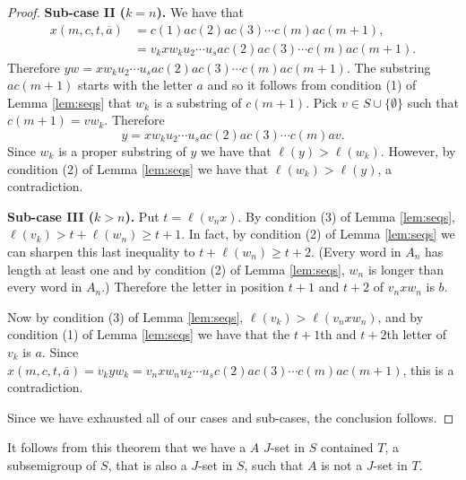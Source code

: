 \begin{proof}
  \textbf{Sub-case II ($k = n$).}
  We have that
  \begin{align*}
    x(m, c, t, \overline{a}) &= c(1)ac(2)ac(3) \cdots c(m)ac(m+1), \\
                             &= v_kxw_ku_2 \cdots u_sac(2)ac(3) \cdots c(m)ac(m+1).
  \end{align*}
  Therefore $yw = xw_ku_2 \cdots u_sac(2)ac(3) \cdots c(m)ac(m+1)$. 
  The substring $ac(m+1)$ starts with the letter $a$ and so it follows from condition (1) of Lemma \ref{lem:seqs} that $w_k$ is a substring of $c(m+1)$.
  Pick $v \in S \cup \{\emptyset\}$ such that $c(m+1) = vw_k$. 
  Therefore 
  \[
    y = xw_ku_2 \cdots u_sac(2)ac(3) \cdots c(m)av.
  \]
  Since $w_k$ is a proper substring of $y$ we have that $\ell(y) > \ell(w_k)$.
  However, by condition (2) of Lemma \ref{lem:seqs} we have that $\ell(w_k) > \ell(y)$, a contradiction. 

  \textbf{Sub-case III ($k > n$).}
  Put $t = \ell(v_nx)$.
  By condition (3) of Lemma \ref{lem:seqs}, $\ell(v_k) > t + \ell(w_n) \ge t+1$.
  In fact, by condition (2) of Lemma \ref{lem:seqs} we can sharpen this last inequality to $t + \ell(w_n) \ge t+2$.
  (Every word in $A_n$ has length at least one and by condition (2) of Lemma \ref{lem:seqs}, $w_n$ is longer than every word in $A_n$.)
  Therefore the letter in position $t+1$ and $t+2$ of $v_nxw_n$ is $b$. 

  Now by condition (3) of Lemma \ref{lem:seqs}, $\ell(v_k) > \ell(v_nxw_n)$, and by condition (1) of Lemma \ref{lem:seqs} we have that the $t+1$th and $t+2$th letter of $v_k$ is $a$. 
  Since $x(m, c, t, \overline{a}) = v_kyw_k = v_nxw_nu_2\cdots u_sc(2)ac(3)\cdots c(m)ac(m+1)$, this is a contradiction.

Since we have exhausted all of our cases and sub-cases, the conclusion follows.
\end{proof}

It follows from this theorem that we have a $A$ $J$-set in $S$ contained $T$, a subsemigroup of $S$, that is also a $J$-set in $S$, such that $A$ is not a $J$-set in $T$.